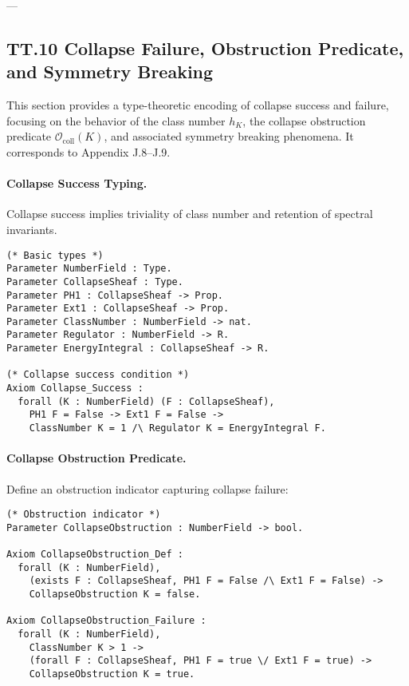 \documentclass[11pt]{article}
\begin{document}
---

\subsection*{TT.10 Collapse Failure, Obstruction Predicate, and Symmetry Breaking}

This section provides a type-theoretic encoding of collapse success and failure,  
focusing on the behavior of the class number \( h_K \), the collapse obstruction predicate \( \mathcal{O}_{\mathrm{coll}}(K) \),  
and associated symmetry breaking phenomena. It corresponds to Appendix J.8–J.9.

\paragraph{Collapse Success Typing.}
Collapse success implies triviality of class number and retention of spectral invariants.

\begin{lstlisting}[language=Coq]
(* Basic types *)
Parameter NumberField : Type.
Parameter CollapseSheaf : Type.
Parameter PH1 : CollapseSheaf -> Prop.
Parameter Ext1 : CollapseSheaf -> Prop.
Parameter ClassNumber : NumberField -> nat.
Parameter Regulator : NumberField -> R.
Parameter EnergyIntegral : CollapseSheaf -> R.

(* Collapse success condition *)
Axiom Collapse_Success :
  forall (K : NumberField) (F : CollapseSheaf),
    PH1 F = False -> Ext1 F = False ->
    ClassNumber K = 1 /\ Regulator K = EnergyIntegral F.
\end{lstlisting}

\paragraph{Collapse Obstruction Predicate.}

Define an obstruction indicator capturing collapse failure:

\begin{lstlisting}[language=Coq]
(* Obstruction indicator *)
Parameter CollapseObstruction : NumberField -> bool.

Axiom CollapseObstruction_Def :
  forall (K : NumberField),
    (exists F : CollapseSheaf, PH1 F = False /\ Ext1 F = False) ->
    CollapseObstruction K = false.

Axiom CollapseObstruction_Failure :
  forall (K : NumberField),
    ClassNumber K > 1 ->
    (forall F : CollapseSheaf, PH1 F = true \/ Ext1 F = true) ->
    CollapseObstruction K = true.
\end{lstlisting}
\end{document}
